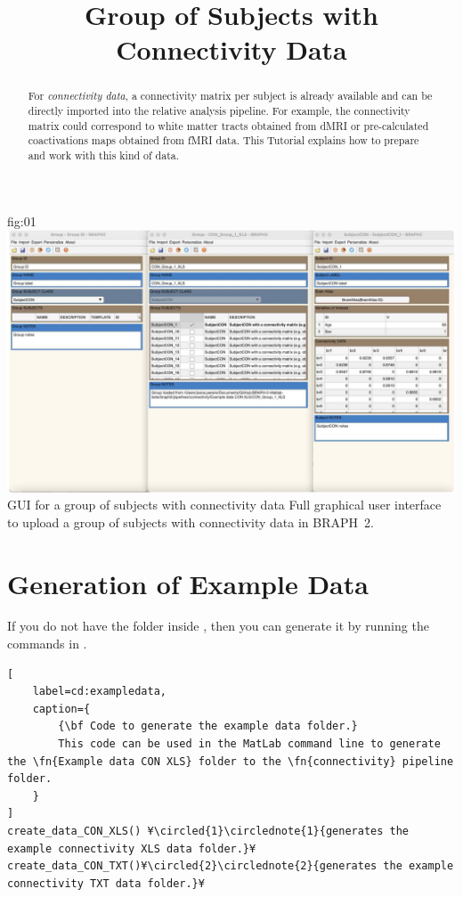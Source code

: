 \documentclass[justified]{tufte-handout}
\title{Group of Subjects with Connectivity Data}
\begin{document}
\maketitle

\begin{abstract}
\noindent
For \emph{connectivity data}, a connectivity matrix per subject is already available and can be directly imported into the relative analysis pipeline. For example, the connectivity matrix could correspond to white matter tracts obtained from dMRI or pre-calculated coactivations maps obtained from fMRI data.
This Tutorial explains how to prepare and work with this kind of data.
\end{abstract}

\tableofcontents

	{fig:01}
	{\includegraphics{fig01.jpg}}
	{GUI for a group of subjects with connectivity data}
	{
	Full graphical user interface to upload a group of subjects with connectivity data in BRAPH~2. 
	}
	

\clearpage
\section{Generation of Example Data}

If you do not have the  folder inside , then you can generate it by running the commands in .

\begin{lstlisting}[
	label=cd:exampledata,
	caption={
		{\bf Code to generate the example data folder.}
		This code can be used in the MatLab command line to generate the \fn{Example data CON XLS} folder to the \fn{connectivity} pipeline folder.
	}
]
create_data_CON_XLS() ¥\circled{1}\circlednote{1}{generates the example connectivity XLS data folder.}¥
create_data_CON_TXT()¥\circled{2}\circlednote{2}{generates the example connectivity TXT data folder.}¥
\end{lstlisting}
\end{document}
